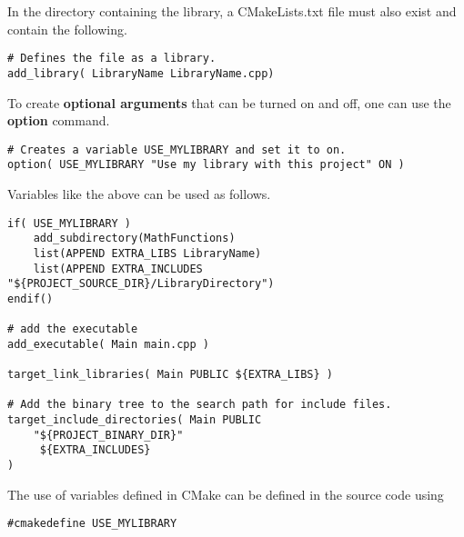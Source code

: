 In the directory containing the library, a CMakeLists.txt file must also exist and contain the following.
\begin{lstlisting}
# Defines the file as a library.
add_library( LibraryName LibraryName.cpp)
\end{lstlisting}

To create \textbf{optional arguments} that can be turned on and off, one can use the \textbf{option} command.
\begin{lstlisting}
# Creates a variable USE_MYLIBRARY and set it to on.
option( USE_MYLIBRARY "Use my library with this project" ON )
\end{lstlisting}

Variables like the above can be used as follows.
\begin{lstlisting}
if( USE_MYLIBRARY )
	add_subdirectory(MathFunctions)
	list(APPEND EXTRA_LIBS LibraryName)
	list(APPEND EXTRA_INCLUDES "${PROJECT_SOURCE_DIR}/LibraryDirectory")
endif()

# add the executable
add_executable( Main main.cpp )

target_link_libraries( Main PUBLIC ${EXTRA_LIBS} )

# Add the binary tree to the search path for include files.
target_include_directories( Main PUBLIC
	"${PROJECT_BINARY_DIR}"
	 ${EXTRA_INCLUDES}
)
\end{lstlisting}

The use of variables defined in CMake can be defined in the source code using
\begin{lstlisting}
#cmakedefine USE_MYLIBRARY
\end{lstlisting}
